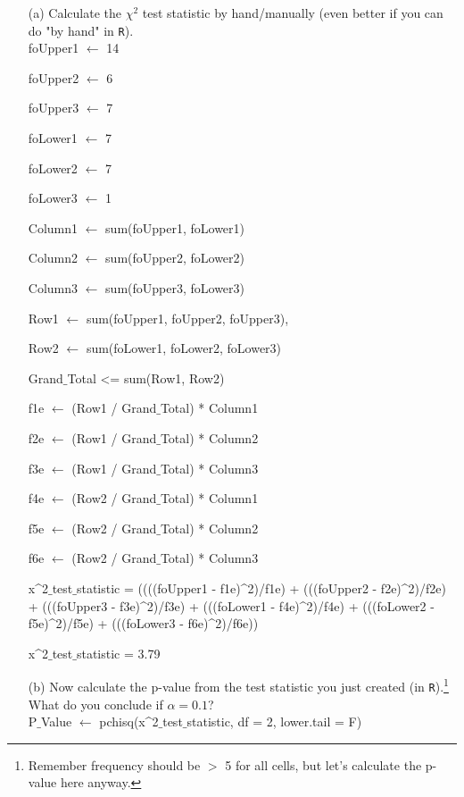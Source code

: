 \documentclass[12pt,letterpaper]{article}
\begin{document}
	\begin{enumerate}
		
		\item [(a)]
		Calculate the $\chi^2$ test statistic by hand/manually (even better if you can do "by hand" in \texttt{R}).\\
		
		foUpper1 $\gets$ 14
		
		foUpper2 $\gets$ 6
		
		foUpper3 $\gets$ 7
		
		foLower1 $\gets$ 7
		
		foLower2 $\gets$ 7
		
		foLower3 $\gets$ 1
		
		Column1 $\gets$ sum(foUpper1, foLower1)
		
		Column2 $\gets$ sum(foUpper2, foLower2)
		
		Column3 $\gets$ sum(foUpper3, foLower3)
		
		Row1 $\gets$ sum(foUpper1, foUpper2, foUpper3), 
		
		Row2 $\gets$ sum(foLower1, foLower2, foLower3)
		
		Grand$\_$Total <= sum(Row1, Row2)
		
		f1e $\gets$ (Row1 / Grand$\_$Total) * Column1
		
		f2e $\gets$ (Row1 / Grand$\_$Total) * Column2
		
		f3e $\gets$ (Row1 / Grand$\_$Total) * Column3
		
		f4e $\gets$ (Row2 / Grand$\_$Total) * Column1
		
		f5e $\gets$ (Row2 / Grand$\_$Total) * Column2
		
		f6e $\gets$ (Row2 / Grand$\_$Total) * Column3
		
		\vspace{.5cm}
		x^2$\_$test$\_$statistic = ((((foUpper1 - f1e)^2)/f1e) + (((foUpper2 - f2e)^2)/f2e) + (((foUpper3 - f3e)^2)/f3e) + (((foLower1 - f4e)^2)/f4e) + (((foLower2 - f5e)^2)/f5e) + (((foLower3 - f6e)^2)/f6e))
		
		\vspace{.5cm}
		x^2$\_$test$\_$statistic = 3.79 
	\newpage
		\item [(b)]
		Now calculate the p-value from the test statistic you just created (in \texttt{R}).\footnote{Remember frequency should be $>$ 5 for all cells, but let's calculate the p-value here anyway.}  What do you conclude if $\alpha = 0.1$?\\
	
		P$\_$Value $\gets$ pchisq(x^2$\_$test$\_$statistic, df = 2, lower.tail = F)
		

\end{enumerate}
\end{document}
